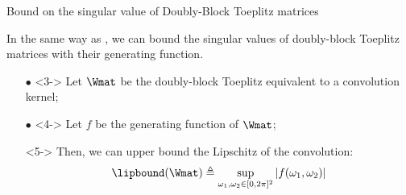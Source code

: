 \begin{frame}{Bound on the singular value of Doubly-Block Toeplitz matrices}

  
  In the same way as {}, we can bound the singular values of doubly-block Toeplitz matrices with their generating function.


  \begin{itemize}
    \item[$\bullet$] <3-> Let $\Wmat$ be the doubly-block Toeplitz equivalent to a convolution kernel;
    \item[$\bullet$] <4-> Let $f$ be the generating function of $\Wmat$;
    \item[\orange{$\rightarrow$}] <5-> Then, we can upper bound the Lipschitz of the convolution:
      \begin{equation}
        \lipbound(\Wmat) \triangleq \sup_{\omega_1, \omega_2 \in [0, 2\pi]^2} |f(\omega_1,\omega_2)|
      \end{equation}
   \end{itemize}

  \vspace{-0.3cm}



\end{frame}


